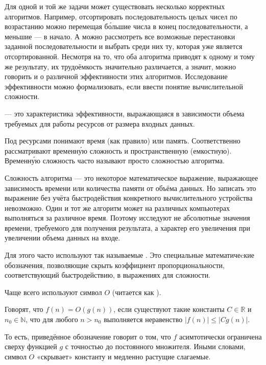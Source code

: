 Для одной и той же задачи может существовать несколько корректных
алгоритмов. Например, отсортировать последовательность целых чисел по
возрастанию можно перемещая бо́льшие числа в конец последовательности,
а меньшие — в начало. А можно рассмотреть все возможные перестановки
заданной последовательности и выбрать среди них ту, которая уже
является отсортированной. Несмотря на то, что оба алгоритма приводят к
одному и тому же результату, их трудоёмкость значительно различается,
а значит, можно говорить и о различной эффективности этих
алгоритмов. Исследование эффективности можно формализовать, если
ввести понятие вычислительной сложности.

\begin{defn}
   — это
  характеристика эффективности, выражающаяся в зависимости объема
  требуемых для работы ресурсов от размера входных данных.
\end{defn}

Под ресурсами понимают время (как правило) или память. Соответственно
рассматривают временну́ю сложность и пространственную (емкостную).
Временну́ю сложность часто называют просто сложностью алгоритма.

Сложность алгоритма — это некоторое математическое выражение,
выражающее зависимость времени или количества памяти от объёма
данных. Но записать это выражение без учёта быстродействия конкретного
вычислительного устройства невозможно.  Один и тот же алгоритм может
на различных компьютерах выполняться за различное время. Поэтому
исследуют не абсолютные значения времени, требуемого для получения
результата, а характер его увеличения при увеличении объема данных на
входе.

Для этого часто используют так называемые . Это специальные математичеcкие обозначения,
позволяющие скрыть коэффициент пропорциональности, соответствующий
быстродействию, в выражениях для сложности.

Чаще всего используют символ $O$ (читается как ).

\begin{defn}
  Говорят, что $f(n)=O(g(n))$, если существуют такие константы
  $C\in\mathbb{R}$ и $n_{0}\in\mathbb{N}$, что для любого $n>n_{0}$
  выполняется неравенство $|f(n)|\leqslant|Cg(n)|$.
\end{defn}

То есть, приведённое обозначение говорит о том, что $f$ асимтотически
ограничена сверху функцией $g$ с точностью до постоянного
множителя. Иными словами, символ $O$ «скрывает» константу и медленно
растущие слагаемые.

